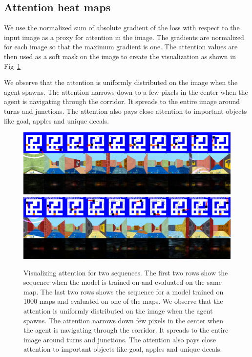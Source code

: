 \subsection{Attention heat maps}
We use the normalized sum of absolute gradient of the loss with respect to the input image as a proxy for attention in the image.
The gradients are normalized for each image so that the maximum gradient is one. The attention values are then used as a soft mask on the image to create the visualization as shown in Fig~\ref{fig:attention}

We observe that the attention is uniformly distributed on the image when the agent spawns. The attention narrows down to a few pixels in the center when the agent is navigating through the corridor. It spreads to the entire image around turns and junctions. The attention also pays close attention to important objects like goal, apples and unique decals.

\begin{figure}
\includegraphics[width=\textwidth,trim=0 0 0 336pt,clip]{./exp-results/training-09x09-0127-on-0127.png}\vspace{1ex}\\
%
\includegraphics[width=\textwidth,trim=0 0 0 336pt,clip]{./exp-results/training-1000-on-0127.png}%
\caption{Visualizing attention for two sequences. The first two rows show the sequence when the model is trained on and evaluated on the same map. The last two rows shows the sequence for a model trained on 1000 maps and evaluated on one of the maps. We observe that the attention is uniformly distributed on the image when the agent spawns. The attention narrows down few pixels in the center when the agent is navigating through the corridor. It spreads to the entire image around turns and junctions. The attention also pays close attention to important objects like goal, apples and unique decals.}
\label{fig:attention}
\end{figure}


%



